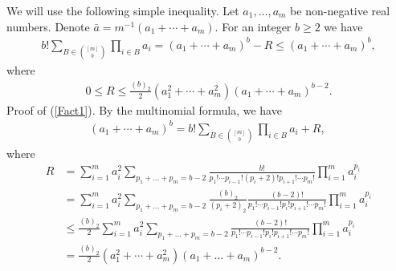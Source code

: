 \documentclass[11pt, a4paper]{article}
\begin{document}
We will use the following simple inequality.
Let $a_1,\dots, a_m$ be non-negative real numbers. Denote ${\bar a}=m^{-1}(a_1+\cdots+a_m)$.
For an integer $b\ge 2$ we have
\begin{align}
\label{Fact1}
b!\sum_{B\in\binom{[m]}{b}}\prod_{i\in B}a_i
=
(a_1+\cdots+a_m)^b
-
R
\le 
(a_1+\cdots+a_m)^b,
\end{align}
where
\begin{align*}
0
\le 
R
\le
\frac{(b)_2}{2}
(a_1^2+\cdots+a_m^2)
(a_1+\cdots+a_m)^{b-2}.
\end{align*}
Proof of (\ref{Fact1}). 
By the multinomial formula, we have
\begin{align*}
(a_1+\cdots+a_m)^b
=
b!\sum_{B\in\binom{[m]}{b}}\prod_{i\in B}a_i
+R,\
\end{align*}
where
\begin{align*}
R
&
=
\sum_{i=1}^m
a_i^2
\sum_{p_1+\dots+p_m=b-2}
\frac{b!}{p_1!\cdots p_{i-1}!(p_i+2)!p_{i+1}!\cdots p_m!}
\prod_{i=1}^m
a_i^{p_i}
\\
&
=
\sum_{i=1}^m
a_i^2
\sum_{p_1+\dots+p_m=b-2}
\frac{(b)_2}{(p_i+2)_2}
\frac{(b-2)!}{p_1!\cdots p_{i-1}!p_i!p_{i+1}!\cdots p_m!}
\prod_{i=1}^m
a_i^{p_i}
\\
&
\le 
\frac{(b)_2}{2}
\sum_{i=1}^m
a_i^2
\sum_{p_1+\dots+p_m=b-2}
\frac{(b-2)!}{p_1!\cdots p_{i-1}!p_i!p_{i+1}!\cdots p_m!}
\prod_{i=1}^m
a_i^{p_i}
\\
&
=
\frac{(b)_2}{2}
(a_1^2+\cdots+a_m^2)
(a_1+\dots+a_m)^{b-2}.
\end{align*} 
\end{document}
